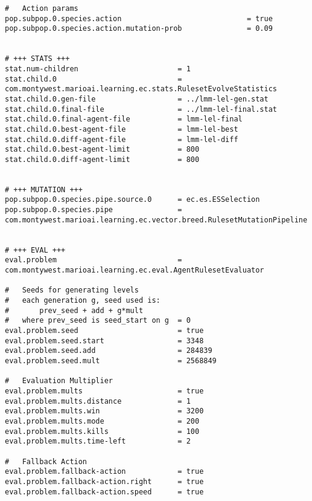 \begin{minipage}{0.9\linewidth}
\begin{lstlisting}
#	Action params
pop.subpop.0.species.action								= true
pop.subpop.0.species.action.mutation-prob 				= 0.09


# +++ STATS +++
stat.num-children 						= 1
stat.child.0 							= com.montywest.marioai.learning.ec.stats.RulesetEvolveStatistics
stat.child.0.gen-file					= ../lmm-lel-gen.stat
stat.child.0.final-file 				= ../lmm-lel-final.stat
stat.child.0.final-agent-file			= lmm-lel-final
stat.child.0.best-agent-file			= lmm-lel-best
stat.child.0.diff-agent-file			= lmm-lel-diff
stat.child.0.best-agent-limit			= 800
stat.child.0.diff-agent-limit			= 800


# +++ MUTATION +++
pop.subpop.0.species.pipe.source.0 		= ec.es.ESSelection
pop.subpop.0.species.pipe 				= com.montywest.marioai.learning.ec.vector.breed.RulesetMutationPipeline


# +++ EVAL +++
eval.problem							= com.montywest.marioai.learning.ec.eval.AgentRulesetEvaluator

#	Seeds for generating levels
#	each generation g, seed used is:
#		prev_seed + add + g*mult
#   where prev_seed is seed_start on g  = 0
eval.problem.seed						= true
eval.problem.seed.start					= 3348
eval.problem.seed.add					= 284839
eval.problem.seed.mult					= 2568849

#	Evaluation Multiplier
eval.problem.mults						= true
eval.problem.mults.distance				= 1
eval.problem.mults.win					= 3200
eval.problem.mults.mode					= 200
eval.problem.mults.kills				= 100
eval.problem.mults.time-left			= 2

#	Fallback Action
eval.problem.fallback-action			= true
eval.problem.fallback-action.right		= true
eval.problem.fallback-action.speed		= true
\end{lstlisting}
\end{minipage}

